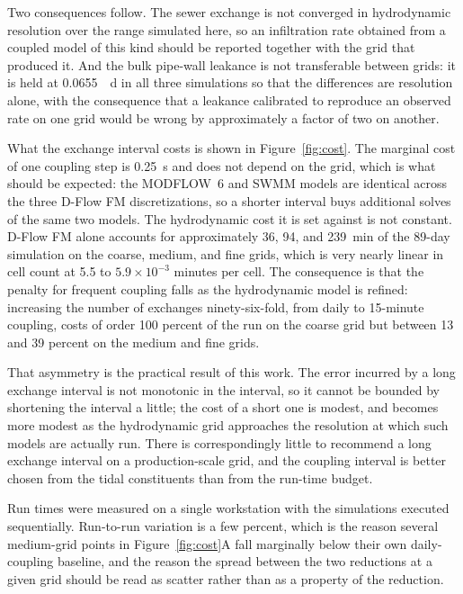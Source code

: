 \documentclass[preprint,authoryear,11pt]{elsarticle}
\begin{document}
Two consequences follow. The sewer exchange is not converged in hydrodynamic resolution over the range simulated here, so an infiltration rate obtained from a coupled model of this kind should be reported together with the grid that produced it. And the bulk pipe-wall leakance is not transferable between grids: it is held at \SI{0.0655}{\per\day} in all three simulations so that the differences are resolution alone, with the consequence that a leakance calibrated to reproduce an observed rate on one grid would be wrong by approximately a factor of two on another.

What the exchange interval costs is shown in Figure~\ref{fig:cost}. The marginal cost of one coupling step is \SI{0.25}{\second} and does not depend on the grid, which is what should be expected: the MODFLOW~6 and SWMM models are identical across the three D-Flow FM discretizations, so a shorter interval buys additional solves of the same two models. The hydrodynamic cost it is set against is not constant. D-Flow FM alone accounts for approximately 36, 94, and \SI{239}{\minute} of the 89-day simulation on the coarse, medium, and fine grids, which is very nearly linear in cell count at 5.5 to $5.9\times10^{-3}$ minutes per cell. The consequence is that the penalty for frequent coupling falls as the hydrodynamic model is refined: increasing the number of exchanges ninety-six-fold, from daily to 15-minute coupling, costs of order 100 percent of the run on the coarse grid but between 13 and 39 percent on the medium and fine grids.

That asymmetry is the practical result of this work. The error incurred by a long exchange interval is not monotonic in the interval, so it cannot be bounded by shortening the interval a little; the cost of a short one is modest, and becomes more modest as the hydrodynamic grid approaches the resolution at which such models are actually run. There is correspondingly little to recommend a long exchange interval on a production-scale grid, and the coupling interval is better chosen from the tidal constituents than from the run-time budget.

Run times were measured on a single workstation with the simulations executed sequentially. Run-to-run variation is a few percent, which is the reason several medium-grid points in Figure~\ref{fig:cost}A fall marginally below their own daily-coupling baseline, and the reason the spread between the two reductions at a given grid should be read as scatter rather than as a property of the reduction.
\end{document}
